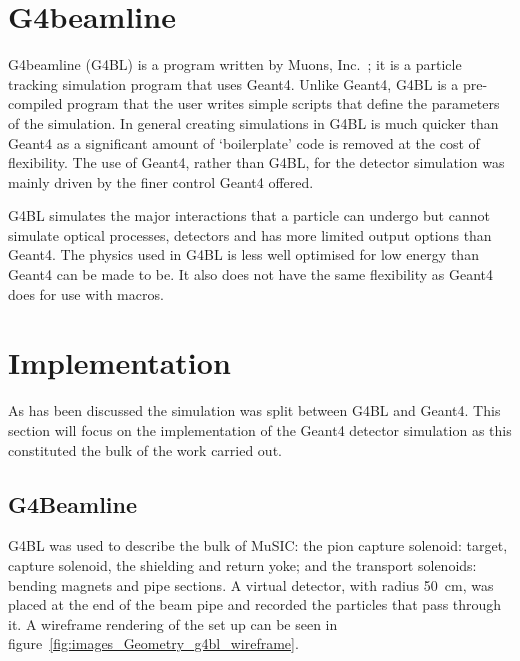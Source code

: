 \section{G4beamline} %
\label{sec:g4beamline}
G4beamline (G4BL) is a program written by Muons, Inc.~\cite{g4bl}; it is a particle tracking simulation program that uses Geant4. Unlike Geant4, G4BL is a pre-compiled program that the user writes simple scripts that define the parameters of the simulation. In general creating simulations in G4BL is much quicker than Geant4 as a significant amount of `boilerplate' code is removed at the cost of flexibility. The use of Geant4, rather than G4BL, for the detector simulation was mainly driven by the finer control Geant4 offered.

G4BL simulates the major interactions that a particle can undergo but cannot simulate optical processes, detectors and has more limited output options than Geant4. The physics used in G4BL is less well optimised for low energy than Geant4 can be made to be. It also does not have the same flexibility as Geant4 does for use with macros.

\section{Implementation} %
\label{cha:implementation}
As has been discussed the simulation was split between G4BL and Geant4. This section will focus on the implementation of the Geant4 detector simulation as this constituted the bulk of the work carried out.

\subsection{G4Beamline} %
\label{sec:g4beamline_impl}
G4BL was used to describe the bulk of MuSIC: the pion capture solenoid: target, capture solenoid, the shielding and return yoke; and the transport solenoids: bending magnets and pipe sections. A virtual detector, with radius 50~cm, was placed at the end of the beam pipe and recorded the particles that pass through it. A wireframe rendering of the set up can be seen in figure~\ref{fig:images_Geometry_g4bl_wireframe}. 

